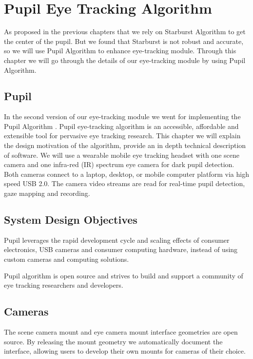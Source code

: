 \documentclass[12pt,fleqn]{book} %
\begin{document}
\chapter{Pupil Eye Tracking Algorithm}
As proposed in the previous chapters that we rely on Starburst Algorithm to get the center of the pupil. But we found that Starburst is not robust and accurate, so we will use Pupil Algorithm to enhance eye-tracking module. Through this chapter we will go through the details of our eye-tracking module by using Pupil Algorithm.

\section{Pupil}
In the second version of our eye-tracking module we went for implementing the Pupil Algorithm \cite{pupil}. Pupil eye-tracking algorithm is an accessible, affordable and extensible tool for pervasive eye tracking research. This chapter we will explain the design motivation of the algorithm, provide an in depth technical description of software. We will use a wearable mobile eye tracking headset with one 
scene camera and one infra-red (IR) spectrum eye camera for dark pupil detection. Both cameras connect to a laptop, desktop, or mobile computer platform via high speed USB 2.0. The camera video streams are read for real-time pupil detection, gaze mapping and recording.  


\section{System Design Objectives}
	Pupil leverages the rapid development cycle and scaling effects of consumer electronics, USB cameras and consumer computing hardware, instead of using custom cameras and computing solutions. \bigskip

Pupil algorithm is open source and strives to build and support a community of eye tracking researchers and developers.

\section{Cameras} 
The scene camera mount and eye camera mount interface geometries are open source. By releasing the mount geometry we automatically document the interface, allowing users to develop their own mounts for cameras of their choice. \bigskip
\end{document}
